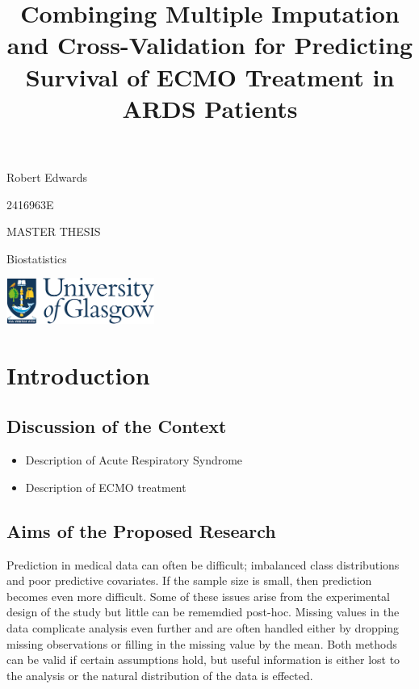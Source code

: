 \documentclass[12pt,]{article}
\title{Combinging Multiple Imputation and Cross-Validation for Predicting
Survival of ECMO Treatment in ARDS Patients}
\author{}
\date{}
\providecommand{\tightlist}{%
  \setlength{\itemsep}{0pt}\setlength{\parskip}{0pt}}
\begin{document}
\maketitle

\vspace{2cm}

\begin{center}
Robert Edwards 

\vspace{0.125cm}
2416963E


\vspace{1cm}
MASTER THESIS 

\vspace{0.125cm}
Biostatistics

\vspace{10cm}
  \includegraphics[height = 1.5cm]{images/GUlogo.png}
\end{center}

\newpage 

\setcounter{tocdepth}{2} \tableofcontents   \newpage

\newpage

\section{Introduction}\label{introduction}

\subsection{Discussion of the Context}\label{discussion-of-the-context}

\begin{itemize}
\tightlist
\item
  Description of Acute Respiratory Syndrome
\item
  Description of ECMO treatment
\end{itemize}

\subsection{Aims of the Proposed
Research}\label{aims-of-the-proposed-research}

Prediction in medical data can often be difficult; imbalanced class
distributions and poor predictive covariates. If the sample size is
small, then prediction becomes even more difficult. Some of these issues
arise from the experimental design of the study but little can be
rememdied post-hoc. Missing values in the data complicate analysis even
further and are often handled either by dropping missing observations or
filling in the missing value by the mean. Both methods can be valid if
certain assumptions hold, but useful information is either lost to the
analysis or the natural distribution of the data is effected.
\end{document}
